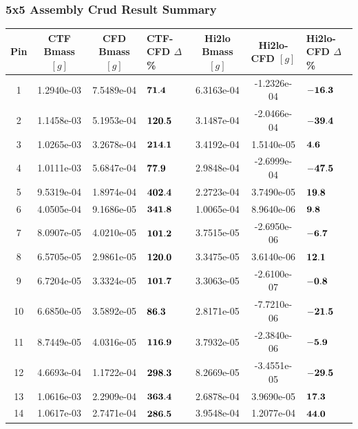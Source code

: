 \documentclass[t, pdftex]{beamer}
\begin{document}
\begin{frame}
\frametitle{5x5 Assembly Crud Result Summary}
\vspace{-8pt}
\begin{table}[h]
    \tiny
    \begin{center}
        \begin{tabular}[h]{|c|c|c|M|c|c|M|}
            \hline
            Pin & CTF Bmass $[g]$ & CFD Bmass $[g]$ & \textbf{CTF-CFD $\Delta$ \%} & Hi2lo Bmass $[g]$ & Hi2lo-CFD $[g]$ & \textbf{Hi2lo-CFD $\Delta$ \%} \\
              &  1.2940e-03 & 7.5489e-04  & $\bf{71.4  }$  & 6.3163e-04 & -1.2326e-04 &  $\bf{-16.3}$ \\
 2  &  1.1458e-03 & 5.1953e-04  & $\bf{120.5 }$  & 3.1487e-04 & -2.0466e-04 & $\bf{ -39.4}$ \\
 3  &  1.0265e-03 & 3.2678e-04  & $\bf{214.1 }$  & 3.4192e-04 & 1.5140e-05 & $\bf{ 4.6 }$ \\
 4  &  1.0111e-03 & 5.6847e-04  & $\bf{77.9  }$  & 2.9848e-04 & -2.6999e-04 &  $\bf{-47.5}$ \\
 5  &  9.5319e-04 & 1.8974e-04  & $\bf{402.4 }$  & 2.2723e-04 & 3.7490e-05 & $\bf{ 19.8 }$ \\
 6  &  4.0505e-04 & 9.1686e-05  & $\bf{341.8 }$  & 1.0065e-04 & 8.9640e-06 & $\bf{ 9.8 }$ \\
 7  &  8.0907e-05 & 4.0210e-05  & $\bf{101.2 }$  & 3.7515e-05 & -2.6950e-06 & $\bf{ -6.7}$ \\
 8  &  6.5705e-05 & 2.9861e-05  & $\bf{120.0 }$  & 3.3475e-05 & 3.6140e-06 & $\bf{ 12.1 }$ \\
 9  &  6.7204e-05 & 3.3324e-05  & $\bf{101.7 }$  & 3.3063e-05 & -2.6100e-07 & $\bf{ -0.8}$ \\
 10  & 6.6850e-05 & 3.5892e-05  & $\bf{86.3  }$  & 2.8171e-05 & -7.7210e-06 & $\bf{ -21.5}$ \\
 11  & 8.7449e-05 & 4.0316e-05  & $\bf{116.9 }$  & 3.7932e-05 & -2.3840e-06 & $\bf{ -5.9}$ \\
 12  & 4.6693e-04 & 1.1722e-04  & $\bf{298.3 }$  & 8.2669e-05 & -3.4551e-05 & $\bf{ -29.5}$ \\
 13  & 1.0616e-03 & 2.2909e-04  & $\bf{363.4 }$  & 2.6878e-04 & 3.9690e-05 & $\bf{ 17.3 }$ \\
 14  & 1.0617e-03 & 2.7471e-04  & $\bf{286.5 }$  & 3.9548e-04 & 1.2077e-04 & $\bf{ 44.0 }$ \\

\end{tabular}
\end{center}
\end{table}
\end{frame}
\end{document}
